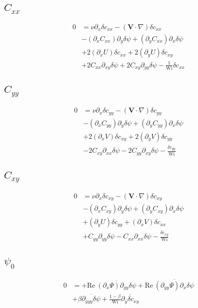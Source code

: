 \documentclass[12,a4paper]{article}
\newcommand{\dd}[1]{\partial_{#1}}
\newcommand{\scxx}{\delta c_{xx}}
\newcommand{\scyy}{\delta c_{yy}}
\newcommand{\scxy}{\delta c_{xy}}
\newcommand{\spsi}{\delta \psi}
\newcommand{\Wi}{\mathrm{Wi}}
\newcommand{\Rey}{\mathrm{Re \ }}
\begin{document}
\subsection{$C_{xx}$}

\begin{align}
    0 &= \nu \dd{x} \scxx - (\mathbf{V}\cdot \nabla) \scxx \nonumber \\
    &- (\dd{x}C_{xx})\dd{y} \spsi + (\dd{y}C_{xx})\dd{x} \spsi \nonumber\\
    &+ 2(\dd{x} U) \scxx + 2(\dd{y} U) \scxy \nonumber\\
    &+ 2C_{xx}\dd{xy} \spsi + 2C_{xy}\dd{yy}\spsi - \frac{1}{\Wi}\scxx
\end{align}

\subsection{$C_{yy}$}

\begin{align}
    0 &= \nu \dd{x} \scyy - (\mathbf{V}\cdot \nabla) \scyy \nonumber \\
    &- (\dd{x}C_{yy})\dd{y}\spsi + (\dd{y}C_{yy})\dd{x} \spsi \nonumber\\
    &+ 2(\dd{x}V)\scxy + 2(\dd{y}V)\scyy \nonumber \\
    &- 2C_{xy}\dd{xx}\spsi - 2C_{yy}\dd{xy} \spsi - \frac{\scyy}{\Wi} 
\end{align}

\subsection{$C_{xy}$}

\begin{align}
    0 &= \nu \dd{x} \scxy - (\mathbf{V}\cdot \nabla) \scxy \nonumber \\
    &- (\dd{x}C_{xy})\dd{y}\spsi + (\dd{y}C_{xy})\dd{x} \spsi \nonumber\\
    &+ (\dd{y}U) \scyy + (\dd{x}V) \scxx \nonumber \\
    &+ C_{yy}\dd{yy} \spsi - C_{xx} \dd{xx} \spsi - \frac{\scxy}{\Wi}
\end{align}

\subsection{$\psi_{0}$}

\begin{align}
    0 &= + \Rey\overline{(\dd{x}\Psi) \dd{yy}\spsi} + \Rey\overline{(\dd{yy}\Psi) \dd{x}\spsi } \nonumber \\
      &+ \beta \overline{\dd{yyy}\spsi} + \frac{1-\beta}{\Wi} \overline{\dd{y}\scxy}
\end{align}
\end{document}
